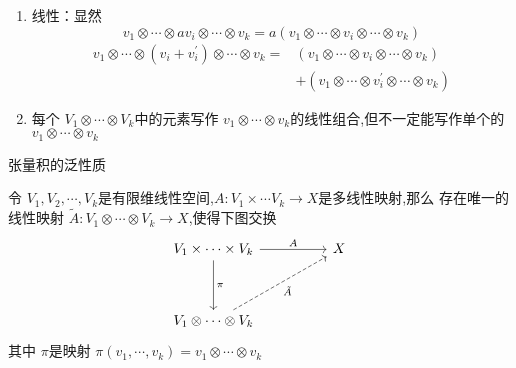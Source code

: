 \documentclass[../../几何与拓扑.tex]{subfiles}
\begin{document}
\begin{remark}
    \begin{enumerate}
        \item 线性：显然 $$
        v_1 \otimes \cdots \otimes av_{i}\otimes \cdots \otimes v_{k}= a\left( v_1\otimes \cdots \otimes v_{i}\otimes \cdots \otimes v_{k} \right) 
        $$ $$
        \begin{aligned}
            v_1\otimes \cdots \otimes \left( v_{i}+ v_{i}^{\prime}  \right) \otimes \cdots \otimes v_{k}= & \left( v_1 \otimes \cdots \otimes v_{i} \otimes \cdots \otimes v_{k} \right)\\ 
             & + \left( v_1\otimes \cdots \otimes  v_{i}^{\prime} \otimes \cdots \otimes v_{k} \right)   
        \end{aligned} 
        $$
        \item 每个 $ V_1\otimes  \cdots \otimes V_{k} $中的元素写作 $ v_1\otimes \cdots \otimes v_{k} $的线性组合,但不一定能写作单个的 $ v_1\otimes \cdots \otimes v_{k} $   
    \end{enumerate}
    
\end{remark}
\begin{proposition}{张量积的泛性质}\label{pro:tensor universal}

    令 $ V_1,V_2,\cdots,V_k $是有限维线性空间,$ A:V_1\times \cdots V_{k} \to X$是多线性映射,那么
    存在唯一的线性映射 $ \tilde{A}: V_1\otimes \cdots \otimes V_{k}\to X $,使得下图交换   
  \[\begin{tikzcd}
	{V_1\times \cdots \times V_{k} } && X \\
	\\
	{V_1 \otimes \cdots \otimes  V_{k}}
	\arrow["A", from=1-1, to=1-3]
	\arrow["\pi", from=1-1, to=3-1]
	\arrow["{ \tilde{A}}"', dashed, from=3-1, to=1-3]
\end{tikzcd}\]其中 $ \pi $是映射 $ \pi\left( v_1,\cdots ,v_{k} \right)  =v_1 \otimes \cdots \otimes  v_{k}$  
\end{proposition}
\end{document}
